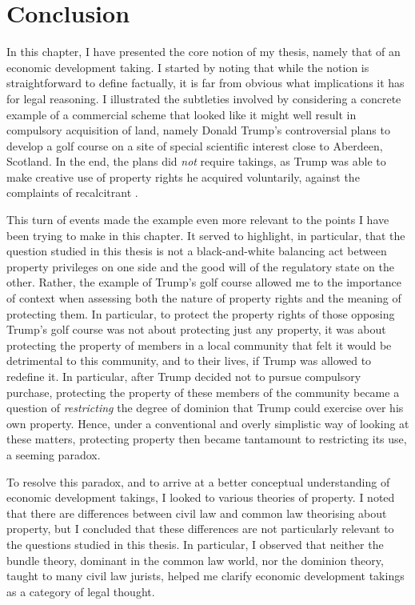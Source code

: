 \section{Conclusion}\label{sec:conc1}

In this chapter, I have presented the core notion of my thesis, namely that of an economic development taking. I started by noting that while the notion is straightforward to define factually, it is far from obvious what implications it has for legal reasoning. I illustrated the subtleties involved by considering a concrete example of a commercial scheme that looked like it might well result in compulsory acquisition of land, namely Donald Trump's controversial plans to develop a golf course on a site of special scientific interest close to Aberdeen, Scotland. In the end, the plans did {\it not} require takings, as Trump was able to make creative use of property rights he acquired voluntarily, against the complaints of recalcitrant .

This turn of events made the example even more relevant to the points I have been trying to make in this chapter. It served to highlight, in particular, that the question studied in this thesis is not a black-and-white balancing act between property privileges on one side and the good will of the regulatory state on the other. Rather, the example of Trump's golf course allowed me to  the importance of context when assessing both the nature of property rights and the meaning of protecting them. In particular, to protect the property rights of those opposing Trump's golf course was not about protecting just any property, it was about protecting the property of members in a local community that felt it would be detrimental to this community, and to their lives, if Trump was allowed to redefine it. In particular, after Trump decided not to pursue compulsory purchase, protecting the property of these members of the community became a question of {\it restricting} the degree of dominion that Trump could exercise over his own property. Hence, under a conventional and overly simplistic way of looking at these matters, protecting property then became tantamount to restricting its use, a seeming paradox.

To resolve this paradox, and to arrive at a better conceptual understanding of economic development takings, I looked to various theories of property. I noted that there are differences between civil law and common law theorising about property, but I concluded that these differences are not particularly relevant to the questions studied in this thesis. In particular, I observed that neither the bundle theory, dominant in the common law world, nor the dominion theory, taught to many civil law jurists, helped me clarify economic development takings as a category of legal thought.

